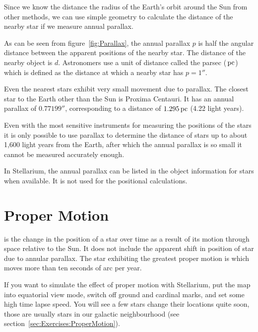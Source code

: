 Since we know the distance the radius of the Earth's orbit around the
Sun from other methods, we can use simple geometry to calculate the
distance of the nearby star if we measure annual parallax.

As can be seen from figure~\ref{fig:Parallax}, the annual
parallax $p$ is half the angular distance between the apparent positions
of the nearby star. The distance of the nearby object is $d$. Astronomers
use a unit of distance called the parsec ($\,\mathrm{pc}$) which is defined as the
distance at which a nearby star has $p=1''$.

Even the nearest stars exhibit very small movement due to
parallax. The closest star to the Earth other than the Sun is Proxima
Centauri. It has an annual parallax of $0.77199''$, corresponding to a
distance of $1.295\,\mathrm{pc}$ (4.22 light years).

Even with the most sensitive instruments for measuring the positions of
the stars it is only possible to use parallax to determine the distance
of stars up to about 1,600 light years from the Earth, after which the
annual parallax is so small it cannot be measured accurately enough.

In Stellarium, the annual parallax can be listed in the object information for stars
when available. It is not used for the positional calculations.

\section{Proper Motion}
\label{sec:Concepts:ProperMotion}

 is the change in the position of a star over time as a
result of its motion through space relative to the Sun. It does not
include the apparent shift in position of star due to annular parallax.
The star exhibiting the greatest proper motion is  which
moves more than ten seconds of arc per year.

If you want to simulate the effect of proper motion with Stellarium,
put the map into equatorial view mode, switch off ground and cardinal
marks, and set some high time lapse speed. You will see a few stars
change their locations quite soon, those are usually stars in our
galactic neighbourhood (see section~\ref{sec:Exercises:ProperMotion}).


